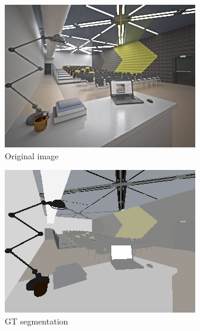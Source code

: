 \begin{figure}[H]
    \centering
    \begin{subfigure}{0.32\linewidth}
        \includegraphics[width=\linewidth]{praca/images/AI53_007_Cam08.png}
        \caption{Original image}
    \end{subfigure}
    \begin{subfigure}{0.32\linewidth}
        \includegraphics[width=\linewidth]{praca/images/AI53_007_Cam08.segmentation.png}
        \caption{GT segmentation}
    \end{subfigure}
    \begin{subfigure}{0.32\linewidth}

\end{subfigure}
\end{figure}
